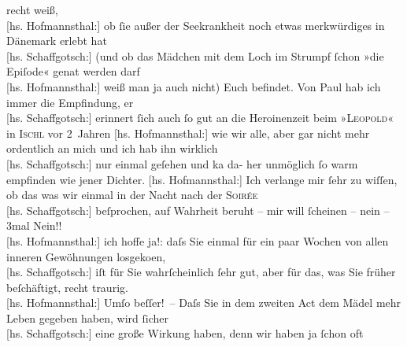 \begin{ledgroupsized}[t]{13cm}
               recht weiß, {\\}{[}hs. Hofmannsthal:{]} ob ſie außer der Seekrankheit noch etwas merkwürdiges
               in Dänemark erlebt hat {\\}{[}hs. Schaffgotsch:{]}  (und ob das Mädchen mit dem Loch im Strumpf ſchon
               »die Epiſode« gena{\geminationn}t werden darf {\\}{[}hs. Hofmannsthal:{]} weiß man ja auch nicht) Euch befindet.\pend
           \pstart
           Von Paul hab ich immer die Empfindung, er {\\}{[}hs. Schaffgotsch:{]} erinnert ſich auch ſo gut an die Heroinenzeit beim
                  »\textsc{Leopold}« in \textsc{Ischl} vor 2 Jahren \pend
           \pstart
           {\pb}{[}hs. Hofmannsthal:{]} wie wir alle, aber gar nicht mehr ordentlich an mich
               und ich hab ihn wirklich {\\}{[}hs. Schaffgotsch:{]} nur einmal geſehen und ka{\geminationn} da- her unmöglich ſo warm empfinden wie jener Dichter.\pend
           \pstart
           {[}hs. Hofmannsthal:{]} Ich verlange mir ſehr zu wiſſen, ob das was wir einmal
               in der Nacht nach der \textsc{Soirée}{\\}{[}hs. Schaffgotsch:{]} beſprochen, auf Wahrheit beruht – mir will ſcheinen –
               nein – 3mal Nein!! {\\}{[}hs. Hofmannsthal:{]} ich hoffe ja!: daſs Sie einmal für ein paar Wochen von
               allen inneren Gewöhnungen losgeko{\geminationm}en, {\\}{[}hs. Schaffgotsch:{]} iſt für Sie wahrſcheinlich ſehr gut, aber \introOben{}für\introOben{} das, was Sie früher beſchäftigt, recht traurig. {\\}{[}hs. Hofmannsthal:{]} Umſo beſſer! – Daſs Sie in dem zweiten Act dem Mädel mehr Leben gegeben haben, wird ſicher {\\}{[}hs. Schaffgotsch:{]} eine große Wirkung haben, denn wir haben ja ſchon oft

\end{ledgroupsized}
